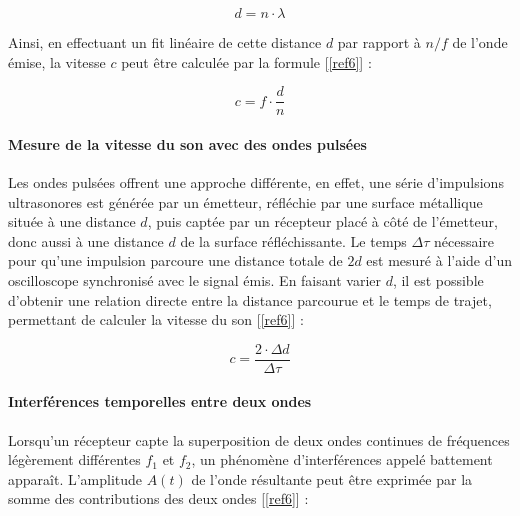 \documentclass[a4paper, 12pt,oneside]{article}
\begin{document}
\vspace{-0.25cm}
\begin{equation}
d = n \cdot \lambda
\label{eq2}
\end{equation}
\vspace{-0.35cm}

Ainsi, en effectuant un fit linéaire de cette distance $d$ par rapport à $n/f$ de l’onde émise, la vitesse $c$ peut être calculée par la formule [\ref{ref6}] :

\vspace{-0.1cm}
\begin{equation}
c = f \cdot \frac{d}{n}
\label{eq3}
\end{equation}
\clearpage

\vspace{-0.2cm}
\paragraph{Mesure de la vitesse du son avec des ondes pulsées}

Les ondes pulsées offrent une approche différente, en effet, une série d’impulsions ultrasonores est générée par un émetteur, réfléchie par une surface métallique située à une distance $d$, puis captée par un récepteur placé à côté de l'émetteur, donc aussi à une distance $d$ de la surface réfléchissante. Le temps $\Delta \tau$ nécessaire pour qu’une impulsion parcoure une distance totale de $2d$ est mesuré à l’aide d’un oscilloscope synchronisé avec le signal émis. En faisant varier $d$, il est possible d’obtenir une relation directe entre la distance parcourue et le temps de trajet, permettant de calculer la vitesse du son [\ref{ref6}] :

\vspace{-0.25cm}
\begin{equation}
c = \frac{2 \cdot \Delta d}{\Delta \tau}
\label{eq4}
\end{equation}
\vspace{-0.25cm}

\paragraph{Interférences temporelles entre deux ondes}

Lorsqu’un récepteur capte la superposition de deux ondes continues de fréquences légèrement différentes $f_1$ et $f_2$, un phénomène d’interférences appelé battement apparaît. L’amplitude $A(t)$ de l’onde résultante peut être exprimée par la somme des contributions des deux ondes [\ref{ref6}] :
\end{document}

